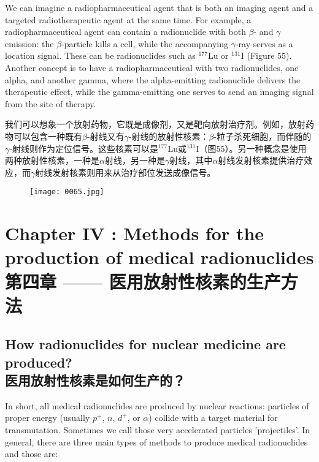 \documentclass[dvipsnames, svgnames,a4paper,11pt]{article}
\begin{document}
We can imagine a radiopharmaceutical agent that is both an imaging agent and a targeted radiotherapeutic agent at the same time. For example, a radiopharmaceutical agent can contain a radionuclide with both \(\beta\)- and \(\gamma\) emission: the \(\beta\)-particle kills a cell, while the accompanying \(\gamma\)-ray serves as a location signal. These can be radionuclides such as \(\mathrm{^{177}Lu}\) or \(\mathrm{^{131}I}\) (Figure 55). Another concept is to have a radiopharmaceutical with two radionuclides, one alpha, and another gamma, where the alpha-emitting radionuclide delivers the therapeutic effect, while the gamma-emitting one serves to send an imaging signal from the site of therapy.

我们可以想象一个放射药物，它既是成像剂，又是靶向放射治疗剂。例如，放射药物可以包含一种既有\(\beta\)-射线又有\(\gamma\)-射线的放射性核素：\(\beta\)-粒子杀死细胞，而伴随的\(\gamma\)-射线则作为定位信号。这些核素可以是\(\mathrm{^{177}Lu}\)或\(\mathrm{^{131}I}\)（图55）。另一种概念是使用两种放射性核素，一种是$\alpha$射线，另一种是$\gamma$射线，其中$\alpha$射线发射核素提供治疗效应，而$\gamma$射线发射核素则用来从治疗部位发送成像信号。

\begin{figure}[ht]
    \centering
    \texttt{[image: 0065.jpg]}
 \label{fig55}
\end{figure}

\newpage

\section{Chapter IV : Methods for the production of medical radionuclides\\第四章 —— 医用放射性核素的生产方法}

\subsection{How radionuclides for nuclear medicine are produced?\\医用放射性核素是如何生产的？}

In short, all medical radionuclides are produced by nuclear reactions: particles of proper energy (usually $p^+$, $n$, $d^+$, or $\alpha$) collide with a target material for transmutation. Sometimes we call those very accelerated particles 'projectiles'. In general, there are three main types of methods to produce medical radionuclides and those are:
\end{document}
